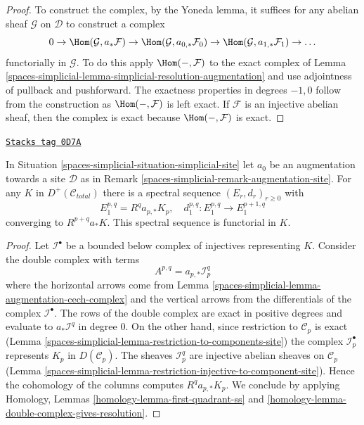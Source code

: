 \begin{proof}
To construct the complex, by the Yoneda lemma, it suffices for any
abelian sheaf $\mathcal{G}$ on $\mathcal{D}$ to construct a complex
$$
0 \to \Hom(\mathcal{G}, a_*\mathcal{F}) \to
\Hom(\mathcal{G}, a_{0, *}\mathcal{F}_0) \to
\Hom(\mathcal{G}, a_{1, *}\mathcal{F}_1) \to \ldots
$$
functorially in $\mathcal{G}$. To do this apply $\Hom(-, \mathcal{F})$
to the exact complex of Lemma \ref{spaces-simplicial-lemma-simplicial-resolution-augmentation}
and use adjointness of pullback and pushforward.
The exactness properties in degrees $-1, 0$ follow from
the construction as $\Hom(-, \mathcal{F})$ is left exact.
If $\mathcal{F}$ is an injective abelian sheaf, then the
complex is exact because $\Hom(-, \mathcal{F})$ is exact.
\end{proof}

\begin{lemma}
\label{spaces-simplicial-lemma-augmentation-spectral-sequence}
\href{https://stacks.math.columbia.edu/tag/0D7A}{\texttt{Stacks tag 0D7A}}

In Situation \ref{spaces-simplicial-situation-simplicial-site} let
$a_0$ be an augmentation towards a site $\mathcal{D}$
as in Remark \ref{spaces-simplicial-remark-augmentation-site}.
For any $K$ in $D^+(\mathcal{C}_{total})$ there is a spectral
sequence
$(E_r, d_r)_{r \geq 0}$ with
$$
E_1^{p, q} = R^qa_{p, *} K_p,\quad
d_1^{p, q} : E_1^{p, q} \to E_1^{p + 1, q}
$$
converging to $R^{p + q}a_*K$. This spectral sequence is functorial in $K$.
\end{lemma}

\begin{proof}
Let $\mathcal{I}^\bullet$ be a bounded below complex of injectives
representing $K$. Consider the double complex with terms
$$
A^{p, q} = a_{p, *}\mathcal{I}^q_p
$$
where the horizontal arrows come from
Lemma \ref{spaces-simplicial-lemma-augmentation-cech-complex}
and the vertical arrows from the differentials of the
complex $\mathcal{I}^\bullet$. The rows of the double complex are exact
in positive degrees and evaluate to $a_*\mathcal{I}^q$ in degree $0$.
On the other hand, since restriction to $\mathcal{C}_p$ is exact
(Lemma \ref{spaces-simplicial-lemma-restriction-to-components-site})
the complex $\mathcal{I}_p^\bullet$ represents $K_p$ in
$D(\mathcal{C}_p)$. The sheaves $\mathcal{I}_p^q$ are injective
abelian sheaves on $\mathcal{C}_p$
(Lemma \ref{spaces-simplicial-lemma-restriction-injective-to-component-site}).
Hence the cohomology of the columns computes $R^qa_{p, *}K_p$.
We conclude by applying
Homology, Lemmas \ref{homology-lemma-first-quadrant-ss} and
\ref{homology-lemma-double-complex-gives-resolution}.
\end{proof}

